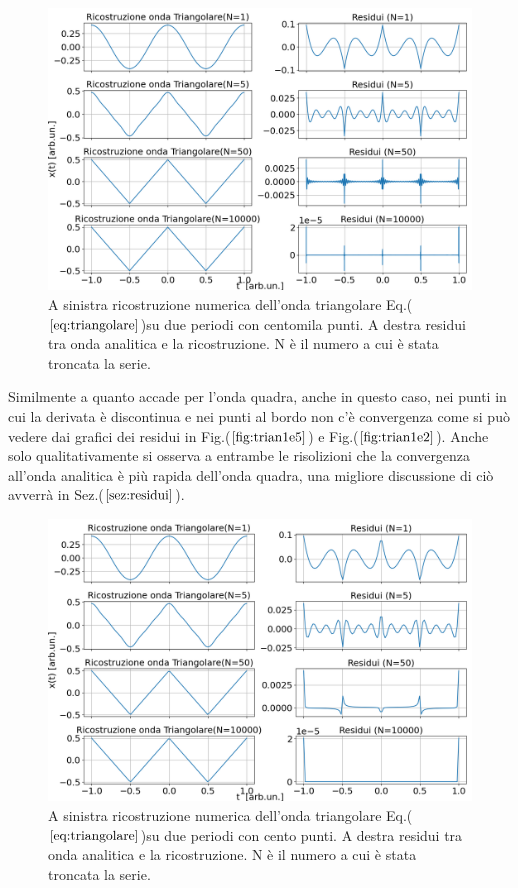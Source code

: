 \documentclass{article}
\begin{document}
        \begin{figure}[H]
            \centering
            \includegraphics[width=1\textwidth]{foutriawave1e5.png} %
            \caption{A sinistra ricostruzione numerica dell'onda triangolare
             Eq.($\ref{eq:triangolare}$)su due periodi con centomila punti.
            A destra residui tra onda analitica e la ricostruzione.
            N è il numero a cui è stata troncata la serie. }
            \label{fig:trian1e5}
        \end{figure}
        Similmente a quanto accade per l'onda quadra, anche in questo caso, nei punti 
        in cui la derivata è discontinua e nei punti al bordo non c'è convergenza come si 
        può vedere dai grafici dei residui in Fig.($\ref{fig:trian1e5}$) e Fig.($\ref{fig:trian1e2}$).
        Anche solo qualitativamente si osserva a entrambe le risolizioni che la convergenza all'onda
        analitica è più rapida dell'onda quadra, una migliore discussione di ciò avverrà in
        Sez.($\ref{sez:residui}$).
        \begin{figure}[H]
            \centering
            \includegraphics[width=1\textwidth]{foutriawave1e2.png} %
            \caption{A sinistra ricostruzione numerica dell'onda triangolare
            Eq.($\ref{eq:triangolare}$)su due periodi con cento punti.
           A destra residui tra onda analitica e la ricostruzione.
           N è il numero a cui è stata troncata la serie. }
            \label{fig:trian1e2}
        \end{figure}        
        
\end{document}
